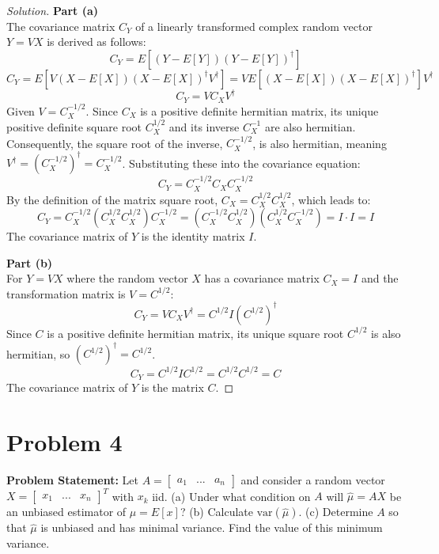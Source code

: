 \documentclass{article}
\begin{document}
\begin{proof}[Solution]
	\textbf{Part (a)}\\
	The covariance matrix $C_Y$ of a linearly transformed complex random vector $Y = VX$ is derived as follows:
	\[ C_Y = E[(Y - E[Y])(Y - E[Y])^\dagger] \]
	\[ C_Y = E[V(X - E[X])(X - E[X])^\dagger V^\dagger] = V E[(X - E[X])(X - E[X])^\dagger] V^\dagger \]
	\[ C_Y = V C_X V^\dagger \]
	Given $V = C_X^{-1/2}$. Since $C_X$ is a positive definite hermitian matrix, its unique positive definite square root $C_X^{1/2}$ and its inverse $C_X^{-1}$ are also hermitian. Consequently, the square root of the inverse, $C_X^{-1/2}$, is also hermitian, meaning $V^\dagger = (C_X^{-1/2})^\dagger = C_X^{-1/2}$.
	Substituting these into the covariance equation:
	\[ C_Y = C_X^{-1/2} C_X C_X^{-1/2} \]
	By the definition of the matrix square root, $C_X = C_X^{1/2} C_X^{1/2}$, which leads to:
	\[ C_Y = C_X^{-1/2} (C_X^{1/2} C_X^{1/2}) C_X^{-1/2} = (C_X^{-1/2} C_X^{1/2}) (C_X^{1/2} C_X^{-1/2}) = I \cdot I = I \]
	The covariance matrix of $Y$ is the identity matrix $I$.
	
	\textbf{Part (b)}\\
	For $Y = VX$ where the random vector $X$ has a covariance matrix $C_X = I$ and the transformation matrix is $V = C^{1/2}$:
	\[ C_Y = V C_X V^\dagger = C^{1/2} I (C^{1/2})^\dagger \]
	Since $C$ is a positive definite hermitian matrix, its unique square root $C^{1/2}$ is also hermitian, so $(C^{1/2})^\dagger = C^{1/2}$.
	\[ C_Y = C^{1/2} I C^{1/2} = C^{1/2} C^{1/2} = C \]
	The covariance matrix of $Y$ is the matrix $C$.
\end{proof}
\vspace{1cm}

\section*{Problem 4}
\textbf{Problem Statement:}
Let $A=[\begin{matrix}a_{1}&...&a_{n}\end{matrix}]$ and consider a random vector $X=[\begin{matrix}x_{1}&...&x_{n}\end{matrix}]^{T}$ with $x_{k}$ iid.
(a) Under what condition on $A$ will $\hat{\mu}=AX$ be an unbiased estimator of $\mu=E[x]$?
(b) Calculate $\text{var}(\hat{\mu})$.
(c) Determine $A$ so that $\hat{\mu}$ is unbiased and has minimal variance. Find the value of this minimum variance.
\end{document}
